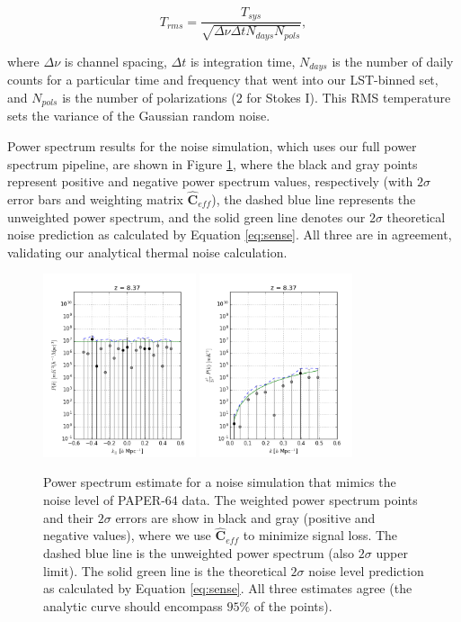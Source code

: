 \documentclass[preprint2,numberedappendix,tighten]{aastex6}  %
\begin{document}
\begin{equation}
T_{rms} = \frac{T_{sys}}{\sqrt{\Delta\nu \Delta t N_{days} N_{pols}}},
\end{equation}

\noindent where $\Delta\nu$ is channel spacing, $\Delta t$ is integration time, $N_{days}$ is the number of daily counts for a 
particular time and frequency that went into our LST-binned set, and $N_{pols}$ is the number of polarizations ($2$ for Stokes 
I). This RMS temperature sets the variance of the Gaussian random noise.

Power spectrum results for the noise simulation, which uses our full power spectrum pipeline, are shown in Figure 
\ref{fig:ps_noise}, where the black and gray points represent positive and negative power spectrum values, respectively (with 
$2\sigma$ error bars and weighting matrix $\hat{\textbf{C}}_{eff}$), the dashed blue line represents the unweighted power 
spectrum, and the solid green line denotes our $2\sigma$ theoretical noise prediction as calculated by Equation 
\eqref{eq:sense}. All three are in agreement, validating our analytical thermal noise calculation. 

\begin{figure}
	\centering
	\includegraphics[width=0.4\textwidth]{plots/ps1_noise_reg.png}
	\includegraphics[width=0.4\textwidth]{plots/ps2_noise_reg.png}
	\caption{Power spectrum estimate for a noise simulation that mimics the noise level of PAPER-64 data. The weighted 
power spectrum points and their $2\sigma$ errors are show in black and gray (positive and negative values), where we use $
\hat{\textbf{C}}_{eff}$ to minimize signal loss. The dashed blue line is the unweighted power spectrum (also $2\sigma$ upper 
limit). The solid green line is the theoretical $2\sigma$ noise level prediction as calculated by Equation \eqref{eq:sense}. All three 
estimates agree (the analytic curve should encompass $95\%$ of the points).}
	\label{fig:ps_noise}
\end{figure}
\end{document}
